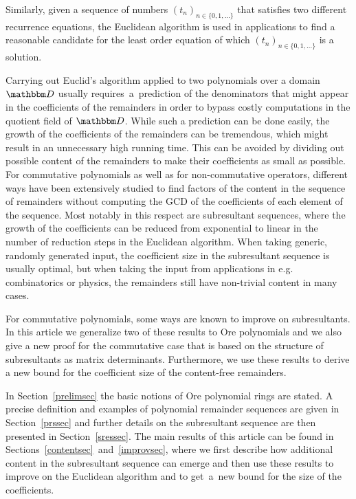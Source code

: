 \documentclass[3p,11pt,preprint]{elsarticle}
\let\set\mathbbm
\def\k{\set D}
\begin{document}
Similarly, given a sequence of numbers $(t_n)_{n\in\{0,1,\dots\}}$ that satisfies two different recurrence equations, the Euclidean algorithm is used in applications to find a reasonable candidate for the least order equation of which $(t_n)_{n\in\{0,1,\dots\}}$ is a solution.

Carrying out Euclid's algorithm applied to two polynomials over a domain $\k$ usually requires~a~prediction of the denominators that might appear in the coefficients of the remainders in order to bypass costly computations in the quotient field of $\k$. While such a prediction can be done easily, the growth of the coefficients of the remainders can be tremendous, which might result in an unnecessary high running time. This can be avoided by dividing out possible content of the remainders to make their coefficients as small as possible. For commutative polynomials as well as for non-commutative operators, different ways have been extensively studied to find factors of the content in the sequence of remainders without computing the GCD of the coefficients of each element of the sequence. Most notably in this respect are subresultant sequences, where the growth of the coefficients can be reduced from exponential to linear in the number of reduction steps in the Euclidean algorithm. When taking generic, randomly 
generated input, the coefficient size in the subresultant sequence is usually optimal, but when taking the input from applications in e.g. combinatorics or physics, the remainders still have non-trivial content in many cases. 

For commutative polynomials, some ways are known to improve on subresultants. In this article we generalize two of these results to Ore polynomials and we also give a new proof for the commutative case that is based on the structure of subresultants as matrix determinants. Furthermore, we use these results to derive a new bound for the coefficient size of the content-free remainders.

In Section~\ref{prelimsec} the basic notions of Ore polynomial rings are stated. A precise definition and examples of polynomial remainder sequences are given in Section~\ref{prssec} and further details on the subresultant sequence are then presented in Section~\ref{sressec}. The main results of this article can be found in Sections~\ref{contentsec}~and~\ref{improvsec}, where we first describe how additional content in the subresultant sequence can emerge and then use these results to improve on the Euclidean algorithm and to get~a~new bound for the size of the coefficients.
\end{document}

